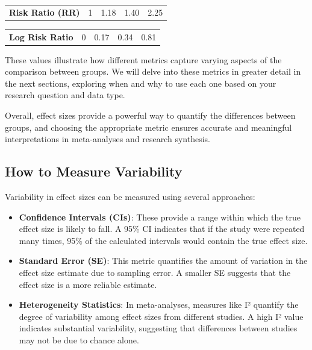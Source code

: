 \documentclass[
]{book}
\begin{document}
\begin{longtable}[]{@{}lllll@{}}
\toprule\noalign{}
\endhead
\bottomrule\noalign{}
\endlastfoot
\textbf{Risk Ratio (RR)} & 1 & 1.18 & 1.40 & 2.25 \\
\end{longtable}

\begin{longtable}[]{@{}lllll@{}}
\toprule\noalign{}
\endhead
\bottomrule\noalign{}
\endlastfoot
\textbf{Log Risk Ratio} & 0 & 0.17 & 0.34 & 0.81 \\
\end{longtable}

These values illustrate how different metrics capture varying aspects of the comparison between groups.
We will delve into these metrics in greater detail in the next sections, exploring when and why to use each one based on your research question and data type.

Overall, effect sizes provide a powerful way to quantify the differences between groups, and choosing the appropriate metric ensures accurate and meaningful interpretations in meta-analyses and research synthesis.

\subsection{How to Measure Variability}\label{how-to-measure-variability}

Variability in effect sizes can be measured using several approaches:

\begin{itemize}
\item
  \textbf{Confidence Intervals (CIs)}: These provide a range within which the true effect size is likely to fall.
  A 95\% CI indicates that if the study were repeated many times, 95\% of the calculated intervals would contain the true effect size.
\item
  \textbf{Standard Error (SE)}: This metric quantifies the amount of variation in the effect size estimate due to sampling error.
  A smaller SE suggests that the effect size is a more reliable estimate.
\item
  \textbf{Heterogeneity Statistics}: In meta-analyses, measures like I² quantify the degree of variability among effect sizes from different studies.
  A high I² value indicates substantial variability, suggesting that differences between studies may not be due to chance alone.
\end{itemize}
\end{document}
